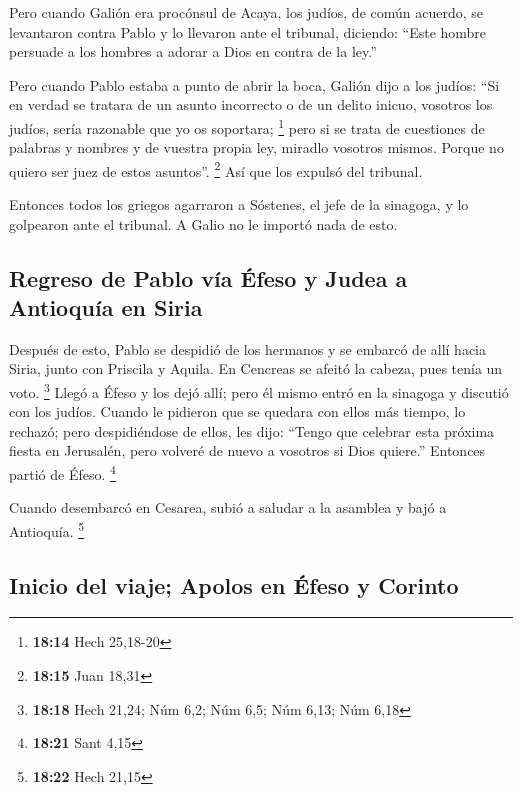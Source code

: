  Pero cuando Galión era procónsul de Acaya, los judíos,
de común acuerdo, se levantaron contra Pablo y lo llevaron ante el
tribunal,  diciendo: ``Este hombre persuade a los hombres
a adorar a Dios en contra de la ley.''

 Pero cuando Pablo estaba a punto de abrir la boca,
Galión dijo a los judíos: ``Si en verdad se tratara de un asunto
incorrecto o de un delito inicuo, vosotros los judíos, sería razonable
que yo os soportara; \footnote{\textbf{18:14} Hech 25,18-20}
 pero si se trata de cuestiones de palabras y nombres y
de vuestra propia ley, miradlo vosotros mismos. Porque no quiero ser
juez de estos asuntos''. \footnote{\textbf{18:15} Juan 18,31}
 Así que los expulsó del tribunal.

 Entonces todos los griegos agarraron a Sóstenes, el jefe
de la sinagoga, y lo golpearon ante el tribunal. A Galio no le importó
nada de esto.

\hypertarget{regreso-de-pablo-vuxeda-uxe9feso-y-judea-a-antioquuxeda-en-siria}{%
\subsection{Regreso de Pablo vía Éfeso y Judea a Antioquía en
Siria}\label{regreso-de-pablo-vuxeda-uxe9feso-y-judea-a-antioquuxeda-en-siria}}

 Después de esto, Pablo se despidió de los hermanos y se
embarcó de allí hacia Siria, junto con Priscila y Aquila. En Cencreas se
afeitó la cabeza, pues tenía un voto. \footnote{\textbf{18:18} Hech
  21,24; Núm 6,2; Núm 6,5; Núm 6,13; Núm 6,18}  Llegó a
Éfeso y los dejó allí; pero él mismo entró en la sinagoga y discutió con
los judíos.  Cuando le pidieron que se quedara con ellos
más tiempo, lo rechazó;  pero despidiéndose de ellos, les
dijo: ``Tengo que celebrar esta próxima fiesta en Jerusalén, pero
volveré de nuevo a vosotros si Dios quiere.'' Entonces partió de Éfeso.
\footnote{\textbf{18:21} Sant 4,15}

 Cuando desembarcó en Cesarea, subió a saludar a la
asamblea y bajó a Antioquía. \footnote{\textbf{18:22} Hech 21,15}

\hypertarget{inicio-del-viaje-apolos-en-uxe9feso-y-corinto}{%
\subsection{Inicio del viaje; Apolos en Éfeso y
Corinto}\label{inicio-del-viaje-apolos-en-uxe9feso-y-corinto}}

